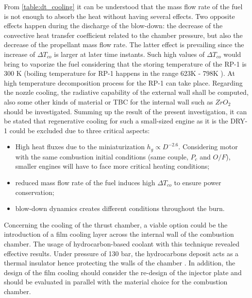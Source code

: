 \pagebreak
From \autoref{table:dt_cooling} it can be understood that the mass flow rate of the fuel is not enough to absorb the heat without having several effects. Two opposite effects happen during the discharge of the blow-down: the decrease of the convective heat transfer coefficient related to the chamber pressure, but also the decrease of the propellant mass flow rate. The latter effect is prevailing since the increase of $\Delta T_{co}$ is larger at later time instants. Such high values of $\Delta T_{co}$ would bring to vaporize the fuel considering that the storing temperature of the RP-1 is 300 K (boiling temperature for RP-1 happens in the range 623K - 798K \cite{rp_1_temp}). At high temperature decomposition process for the RP-1 can take place. Regarding the nozzle cooling, the radiative capability of the external wall shall be computed, also some other kinds of material or TBC for the internal wall such as $ZrO_2$  should be investigated. Summing up the result of the present investigation, it can be stated that regenerative cooling for such a small-sized engine as it is the DRY-1 could be excluded due to three critical aspects:
\begin{itemize}
    \item High heat fluxes due to the miniaturization $h_g \propto D^{-2.6}$. Considering motor with the same combustion initial conditions (same couple, $P_c$ and $O/F$), smaller engines will have to face more critical heating conditions;
    \item reduced mass flow rate of the fuel induces high $\Delta T_{co}$ to ensure power conservation;
    \item blow-down dynamics creates different conditions throughout the burn.
\end{itemize}

Concerning the cooling of the thrust chamber, a viable option could be the introduction of a film cooling layer across the internal wall of the combustion chamber. The usage of hydrocarbon-based coolant with this technique revealed effective results. Under pressure of 130 bar, the hydrocarbons deposit acts as a thermal insulator hence protecting the walls of the chamber \cite{huzel_huang}. In addition, the design of the film cooling should consider the re-design of the injector plate and should be evaluated in parallel with the material choice for the combustion chamber.